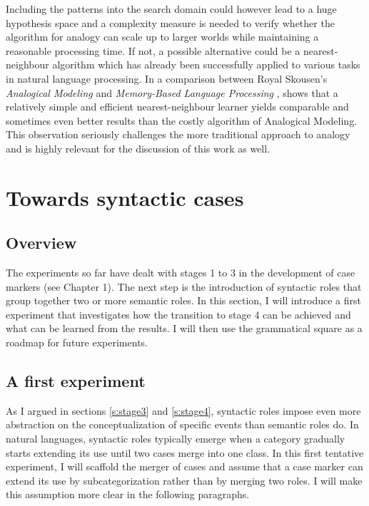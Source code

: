Including the patterns into the search domain could however lead to a huge hypo\-the\-sis space and a complexity measure is needed to verify whether the algorithm for analogy can scale up to larger worlds while maintaining a reasonable processing time. If not, a possible alternative could be a nearest-neighbour algorithm which has already been successfully applied to various tasks in natural language processing. In a comparison between Royal Skou\-sen's {\em Analogical Modeling} \citep{skousen89analogical} and {\em Memory-Based Language Processing} \citep{daelemans05memory}, \citet{daelemans02comparing} shows that a relatively simple and efficient nearest-neighbour learner yields comparable and sometimes even better results than the costly algorithm  of Analogical Modeling. This observation seriously challenges the more traditional approach to analogy and is highly relevant for the discussion of this work as well.

\section{Towards syntactic cases}
\label{s:pattern-exp-4}


\subsection{Overview}
\largerpage
The experiments so far have dealt with stages 1 to 3 in the development of case markers (see Chapter 1). The next step is the introduction of syntactic roles that group together two or more semantic roles. In this section, I will introduce a first experiment that investigates how the transition to stage 4 can be achieved and what can be learned from the results. I will then use the grammatical square as a roadmap for future experiments.

\subsection{A first experiment}

As I argued in sections \ref{s:stage3} and \ref{s:stage4}, syntactic roles impose even more abstraction on the conceptualization of specific events than semantic roles do. In natural languages, syntactic roles typically emerge when a category gradually starts extending its use until two cases merge into one class. In this first tentative experiment, I will scaffold the merger of cases and assume that a case marker can extend its use by subcategorization rather than by merging two roles. I will make this assumption more clear in the following paragraphs.


